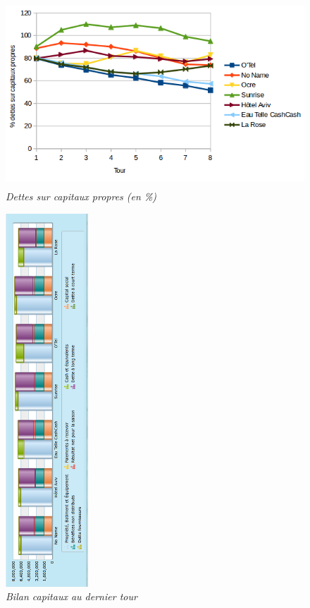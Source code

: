 \documentclass[a4paper,10pt]{article}
\begin{document}
    \begin{figure}[!ht]
      \begin{center}
	\includegraphics[height=7.0cm,keepaspectratio]{./images/dettes_capitaux.png}
      \end{center}
      \caption{\textit{Dettes sur capitaux propres (en \%)}}
    \end{figure}
    
    \begin{figure}[!ht]
      \begin{center}
	\includegraphics[height=14cm,keepaspectratio]{./images/bilan_t8.png}
      \end{center}
      \caption{\textit{Bilan capitaux au dernier tour}}
    \end{figure}
    
\end{document}

